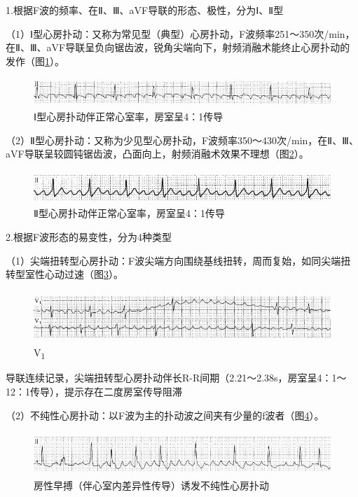 1.根据F波的频率、在Ⅱ、Ⅲ、aVF导联的形态、极性，分为Ⅰ、Ⅱ型

（1）Ⅰ型心房扑动：又称为常见型（典型）心房扑动，F波频率251～350次/min，在Ⅱ、Ⅲ、aVF导联呈负向锯齿波，锐角尖端向下，射频消融术能终止心房扑动的发作（图\ref{fig13-1}）。

\begin{figure}[!htbp]
 \centering
 \includegraphics[width=5.58333in,height=0.42708in]{./images/Image00209.jpg}
 \captionsetup{justification=centering}
 \caption{Ⅰ型心房扑动伴正常心室率，房室呈4：1传导}
 \label{fig13-1}
  \end{figure} 

（2）Ⅱ型心房扑动：又称为少见型心房扑动，F波频率350～430次/min，在Ⅱ、Ⅲ、aVF导联呈较圆钝锯齿波，凸面向上，射频消融术效果不理想（图\ref{fig13-2}）。

\begin{figure}[!htbp]
 \centering
 \includegraphics[width=5.58333in,height=0.48958in]{./images/Image00210.jpg}
 \captionsetup{justification=centering}
 \caption{Ⅱ型心房扑动伴正常心室率，房室呈4：1传导}
 \label{fig13-2}
  \end{figure} 

2.根据F波形态的易变性，分为4种类型

（1）尖端扭转型心房扑动：F波尖端方向围绕基线扭转，周而复始，如同尖端扭转型室性心动过速（图\ref{fig13-3}）。

\begin{figure}[!htbp]
 \centering
 \includegraphics[width=5.58333in,height=0.77083in]{./images/Image00211.jpg}
 \captionsetup{justification=centering}
 \caption{V\textsubscript{1}}
 \label{fig13-3}
  \end{figure} 
导联连续记录，尖端扭转型心房扑动伴长R-R间期（2.21～2.38s，房室呈4：1～12：1传导），提示存在二度房室传导阻滞

（2）不纯性心房扑动：以F波为主的扑动波之间夹有少量的f波者（图\ref{fig13-4}）。

\begin{figure}[!htbp]
 \centering
 \includegraphics[width=5.58333in,height=0.64583in]{./images/Image00212.jpg}
 \captionsetup{justification=centering}
 \caption{房性早搏（伴心室内差异性传导）诱发不纯性心房扑动}
 \label{fig13-4}
  \end{figure} 

